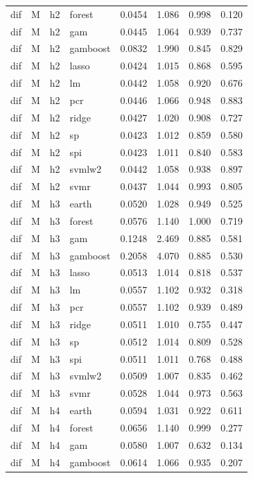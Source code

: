 \begin{ThreePartTable}
\begin{longtable}[t]{llclcccc}
dif & M & h2 & forest & 0.0454 & 1.086 & 0.998 & 0.120\\
dif & M & h2 & gam & 0.0445 & 1.064 & 0.939 & 0.737\\
dif & M & h2 & gamboost & 0.0832 & 1.990 & 0.845 & 0.829\\
dif & M & h2 & lasso & 0.0424 & 1.015 & 0.868 & 0.595\\
dif & M & h2 & lm & 0.0442 & 1.058 & 0.920 & 0.676\\
dif & M & h2 & pcr & 0.0446 & 1.066 & 0.948 & 0.883\\
dif & M & h2 & ridge & 0.0427 & 1.020 & 0.908 & 0.727\\
dif & M & h2 & sp & 0.0423 & 1.012 & 0.859 & 0.580\\
dif & M & h2 & spi & 0.0423 & 1.011 & 0.840 & 0.583\\
dif & M & h2 & svmlw2 & 0.0442 & 1.058 & 0.938 & 0.897\\
dif & M & h2 & svmr & 0.0437 & 1.044 & 0.993 & 0.805\\
\addlinespace
dif & M & h3 & earth & 0.0520 & 1.028 & 0.949 & 0.525\\
dif & M & h3 & forest & 0.0576 & 1.140 & 1.000 & 0.719\\
dif & M & h3 & gam & 0.1248 & 2.469 & 0.885 & 0.581\\
dif & M & h3 & gamboost & 0.2058 & 4.070 & 0.885 & 0.530\\
dif & M & h3 & lasso & 0.0513 & 1.014 & 0.818 & 0.537\\
dif & M & h3 & lm & 0.0557 & 1.102 & 0.932 & 0.318\\
dif & M & h3 & pcr & 0.0557 & 1.102 & 0.939 & 0.489\\
dif & M & h3 & ridge & 0.0511 & 1.010 & 0.755 & 0.447\\
dif & M & h3 & sp & 0.0512 & 1.014 & 0.809 & 0.528\\
dif & M & h3 & spi & 0.0511 & 1.011 & 0.768 & 0.488\\
dif & M & h3 & svmlw2 & 0.0509 & 1.007 & 0.835 & 0.462\\
dif & M & h3 & svmr & 0.0528 & 1.044 & 0.973 & 0.563\\
\addlinespace
dif & M & h4 & earth & 0.0594 & 1.031 & 0.922 & 0.611\\
dif & M & h4 & forest & 0.0656 & 1.140 & 0.999 & 0.277\\
dif & M & h4 & gam & 0.0580 & 1.007 & 0.632 & 0.134\\
dif & M & h4 & gamboost & 0.0614 & 1.066 & 0.935 & 0.207\\

\end{longtable}
\end{ThreePartTable}
